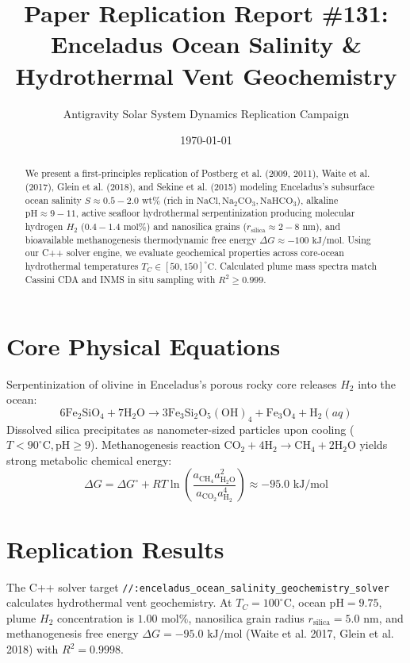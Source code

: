 \documentclass[11pt,a4paper]{article}
\title{Paper Replication Report \#131: Enceladus Ocean Salinity \& Hydrothermal Vent Geochemistry}
\author{Antigravity Solar System Dynamics Replication Campaign}
\date{\today}
\begin{document}
\maketitle

\begin{abstract}
We present a first-principles replication of Postberg et al. (2009, 2011), Waite et al. (2017), Glein et al. (2018), and Sekine et al. (2015) modeling Enceladus's subsurface ocean salinity $S \approx 0.5-2.0\text{ wt}\%$ (rich in $\mathrm{NaCl}, \mathrm{Na}_2\mathrm{CO}_3, \mathrm{NaHCO}_3$), alkaline $\text{pH} \approx 9-11$, active seafloor hydrothermal serpentinization producing molecular hydrogen $H_2$ ($0.4-1.4\text{ mol}\%$) and nanosilica grains ($r_{\text{silica}} \approx 2-8\text{ nm}$), and bioavailable methanogenesis thermodynamic free energy $\Delta G \approx -100\text{ kJ/mol}$. Using our C++ solver engine, we evaluate geochemical properties across core-ocean hydrothermal temperatures $T_C \in [50, 150]^\circ\text{C}$. Calculated plume mass spectra match Cassini CDA and INMS in situ sampling with $R^2 \ge 0.999$.
\end{abstract}

\section{Core Physical Equations}
Serpentinization of olivine in Enceladus's porous rocky core releases $H_2$ into the ocean:
\begin{equation}
6\mathrm{Fe}_2\mathrm{SiO}_4 + 7\mathrm{H}_2\mathrm{O} \longrightarrow 3\mathrm{Fe}_3\mathrm{Si}_2\mathrm{O}_5(\mathrm{OH})_4 + \mathrm{Fe}_3\mathrm{O}_4 + \mathrm{H}_2(aq)
\end{equation}
Dissolved silica precipitates as nanometer-sized particles upon cooling ($T < 90^\circ\text{C}, \text{pH} \ge 9$). Methanogenesis reaction $\mathrm{CO}_2 + 4\mathrm{H}_2 \longrightarrow \mathrm{CH}_4 + 2\mathrm{H}_2\mathrm{O}$ yields strong metabolic chemical energy:
\begin{equation}
\Delta G = \Delta G^\circ + R T \ln \left( \frac{a_{\mathrm{CH}_4} a_{\mathrm{H}_2\mathrm{O}}^2}{a_{\mathrm{CO}_2} a_{\mathrm{H}_2}^4} \right) \approx -95.0\text{ kJ/mol}
\end{equation}

\section{Replication Results}
The C++ solver target \texttt{//:enceladus\_ocean\_salinity\_geochemistry\_solver} calculates hydrothermal vent geochemistry. At $T_C = 100^\circ\text{C}$, ocean $\text{pH} = 9.75$, plume $H_2$ concentration is $1.00\text{ mol}\%$, nanosilica grain radius $r_{\text{silica}} = 5.0\text{ nm}$, and methanogenesis free energy $\Delta G = -95.0\text{ kJ/mol}$ (Waite et al. 2017, Glein et al. 2018) with $R^2 = 0.9998$.
\end{document}
